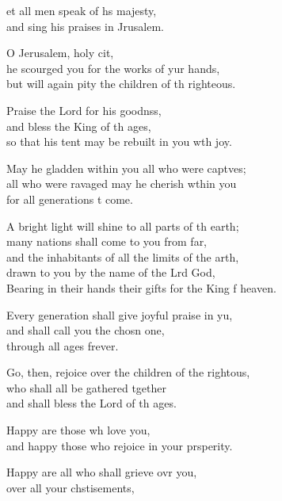 \settowidth{\versewidth}{Bearing in their hands their gifts for the King of heaven.}
\begin{psalmverse}%
  \begin{patverse}
et all men speak of h\pointup{\i}s majesty,\Med\\
and sing his praises in Jrusalem.

O Jerusalem, holy cit,\Flex\\
he scourged you for the works of yur hands,\Med\\
but will again pity the children of th righteous.

Praise the Lord for his goodnss,\Flex\\
and bless the King of th ages,\Med\\
so that his tent may be rebuilt in you w\pointup{\i}th joy.

May he gladden within you all who were capt\pointup{\i}ves;\Flex\\
all who were ravaged may he cherish w\pointup{\i}thin you\Med\\
for all generations t come.

A bright light will shine to all parts of th earth;\Med\\
many nations shall come to you from far,\\
and the inhabitants of all the limits of the arth,\Flex\\
drawn to you by the name of the Lrd God,\Med\\
Bearing in their hands their gifts for the King f heaven.

Every generation shall give joyful praise in yu,\Flex\\
and shall call you the chosn one,\Med\\
through all ages frever.

Go, then, rejoice over the children of the rightous,\Flex\\
who shall all be gathered tgether\Med\\
and shall bless the Lord of th ages.

Happy are those wh love you,\Med\\
and happy those who rejoice in your prsperity.

Happy are all who shall grieve ovr you,\Med\\
over all your chstisements,


\end{patverse}
\end{psalmverse}
